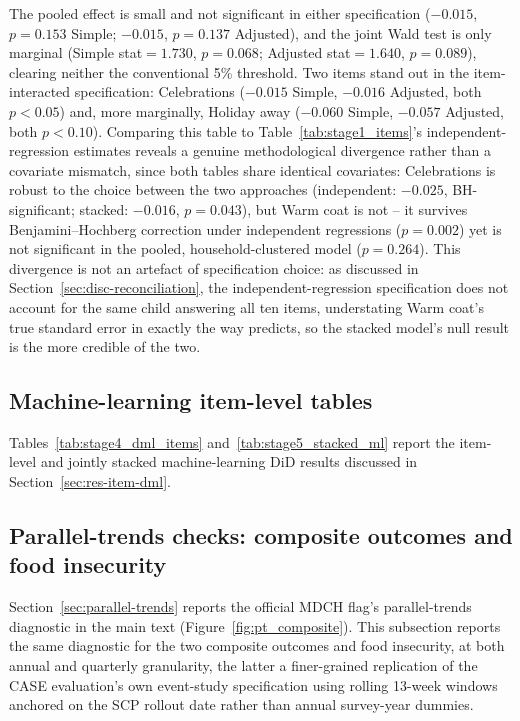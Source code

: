 The pooled effect is small and not significant in either specification ($-0.015$, $p=0.153$ Simple; $-0.015$, $p=0.137$ Adjusted), and the joint Wald test is only marginal (Simple stat$=1.730$, $p=0.068$; Adjusted stat$=1.640$, $p=0.089$), clearing neither the conventional 5\% threshold. Two items stand out in the item-interacted specification: Celebrations ($-0.015$ Simple, $-0.016$ Adjusted, both $p<0.05$) and, more marginally, Holiday away ($-0.060$ Simple, $-0.057$ Adjusted, both $p<0.10$). Comparing this table to Table~\ref{tab:stage1_items}'s independent-regression estimates reveals a genuine methodological divergence rather than a covariate mismatch, since both tables share identical covariates: Celebrations is robust to the choice between the two approaches (independent: $-0.025$, BH-significant; stacked: $-0.016$, $p=0.043$), but Warm coat is not -- it survives Benjamini--Hochberg correction under independent regressions ($p=0.002$) yet is not significant in the pooled, household-clustered model ($p=0.264$). This divergence is not an artefact of specification choice: as discussed in Section~\ref{sec:disc-reconciliation}, the independent-regression specification does not account for the same child answering all ten items, understating Warm coat's true standard error in exactly the way \citet{moulton1990} predicts, so the stacked model's null result is the more credible of the two.

\subsection{Machine-learning item-level tables}
\label{sec:appendix-tables}

Tables~\ref{tab:stage4_dml_items} and~\ref{tab:stage5_stacked_ml} report the item-level and jointly stacked machine-learning DiD results discussed in Section~\ref{sec:res-item-dml}.




\subsection{Parallel-trends checks: composite outcomes and food insecurity}
\label{sec:appendix-quarterly}

Section~\ref{sec:parallel-trends} reports the official MDCH flag's parallel-trends diagnostic in the main text (Figure~\ref{fig:pt_composite}). This subsection reports the same diagnostic for the two composite outcomes and food insecurity, at both annual and quarterly granularity, the latter a finer-grained replication of the CASE evaluation's own event-study specification using rolling 13-week windows anchored on the SCP rollout date rather than annual survey-year dummies.

